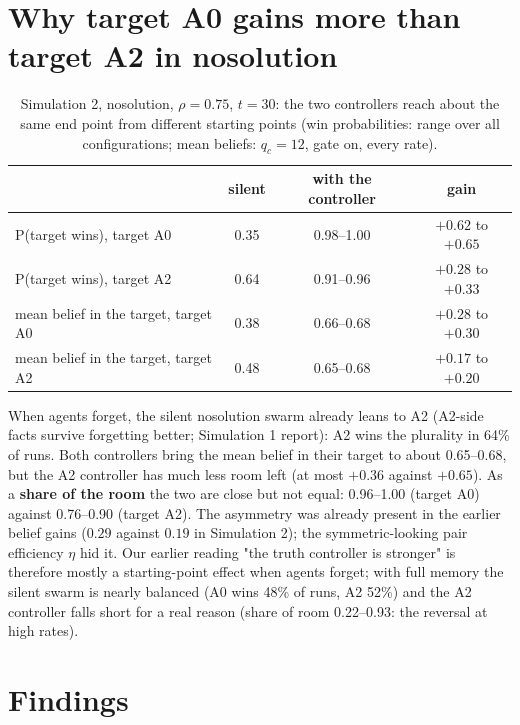 \documentclass[10pt,a4paper]{article}
\begin{document}
\section{Why target A0 gains more than target A2 in nosolution}

\begin{table}[H]
\centering\small
\caption{Simulation 2, nosolution, $\rho = 0.75$, $t = 30$: the two controllers reach about the same end
point from different starting points (win probabilities: range over all configurations; mean beliefs:
$q_c = 12$, gate on, every rate).}
\begin{tabular}{lccc}
\toprule
 & silent & with the controller & gain \\
\midrule
P(target wins), target A0 & 0.35 & 0.98--1.00 & $+0.62$ to $+0.65$ \\
P(target wins), target A2 & 0.64 & 0.91--0.96 & $+0.28$ to $+0.33$ \\
mean belief in the target, target A0 & 0.38 & 0.66--0.68 & $+0.28$ to $+0.30$ \\
mean belief in the target, target A2 & 0.48 & 0.65--0.68 & $+0.17$ to $+0.20$ \\
\bottomrule
\end{tabular}
\end{table}

\noindent When agents forget, the silent nosolution swarm already leans to A2 (A2-side facts survive
forgetting better; Simulation 1 report): A2 wins the plurality in 64\% of runs. Both controllers bring the
mean belief in their target to about 0.65--0.68, but the A2 controller has much less room left (at most
$+0.36$ against $+0.65$). As a \textbf{share of the room} the two are close but not equal: 0.96--1.00
(target A0) against 0.76--0.90 (target A2). The asymmetry was already present in the earlier belief gains
($0.29$ against $0.19$ in Simulation 2); the symmetric-looking pair efficiency $\eta$ hid it. Our earlier
reading "the truth controller is stronger" is therefore mostly a starting-point effect when agents
forget; with full memory the silent swarm is nearly balanced (A0 wins 48\% of runs, A2 52\%) and the A2 controller falls short
for a real reason (share of room 0.22--0.93: the reversal at high rates).

\section{Findings}
\end{document}
